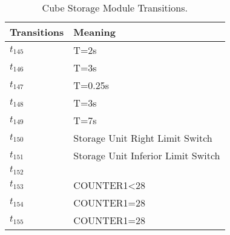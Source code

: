 \begin{table}[H]
\caption{Cube Storage Module Transitions.}
\centering
\begin{tabular}{M{5cm}M{10cm}}
Transitions & Meaning\\
\hline
\hyperlink{partialNet:tt1451}{\hypertarget{partialTable:tt145}{$t_{145}$}} & T=2s\\
\hyperlink{partialNet:tt1461}{\hypertarget{partialTable:tt146}{$t_{146}$}} & T=3s\\
\hyperlink{partialNet:tt1471}{\hypertarget{partialTable:tt147}{$t_{147}$}} & T=0.25s\\
\hyperlink{partialNet:tt1481}{\hypertarget{partialTable:tt148}{$t_{148}$}} & T=3s\\
\hyperlink{partialNet:tt1491}{\hypertarget{partialTable:tt149}{$t_{149}$}} & T=7s\\
\hyperlink{partialNet:t1501}{\hypertarget{partialTable:t150}{$t_{150}$}} & Storage Unit Right Limit Switch\\
\hyperlink{partialNet:t1511}{\hypertarget{partialTable:t151}{$t_{151}$}} & Storage Unit Inferior Limit Switch\\
\hyperlink{partialNet:t1521}{\hypertarget{partialTable:t152}{$t_{152}$}} & \\
\hyperlink{partialNet:t1531}{\hypertarget{partialTable:t153}{$t_{153}$}} & COUNTER1<28\\
\hyperlink{partialNet:t1541}{\hypertarget{partialTable:t154}{$t_{154}$}} & COUNTER1=28\\
\hyperlink{partialNet:t1551}{\hypertarget{partialTable:t155}{$t_{155}$}} & COUNTER1=28\\
\end{tabular}
\end{table}
